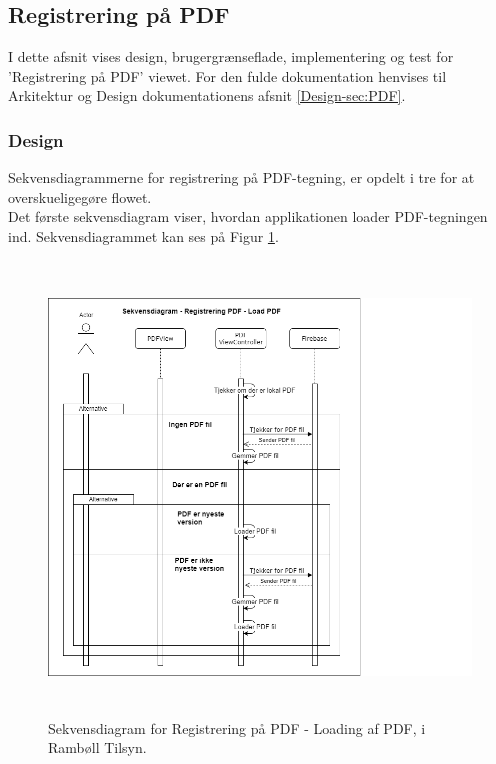 \subsection{Registrering på PDF}
I dette afsnit vises design, brugergrænseflade, implementering og test for 'Registrering på PDF' viewet. For den fulde dokumentation henvises til Arkitektur og Design dokumentationens afsnit \ref{Design-sec:PDF}.
\subsubsection{Design}
Sekvensdiagrammerne for registrering på PDF-tegning, er opdelt i tre for at overskueligegøre flowet. \\
Det første sekvensdiagram viser, hvordan applikationen loader PDF-tegningen ind. Sekvensdiagrammet kan ses på Figur \ref{fig:LoadPDFSekvensDiagram}.
\begin{figure}[H] %
	\centering
	\includegraphics[height=12cm, width=15cm]{Design/Applikation/RegistrePDF/LoadPDFSekvensDiagram}
	\caption{Sekvensdiagram for Registrering på PDF - Loading af PDF, i Rambøll Tilsyn.}
	\label{fig:LoadPDFSekvensDiagram}
\end{figure}

\clearpage

